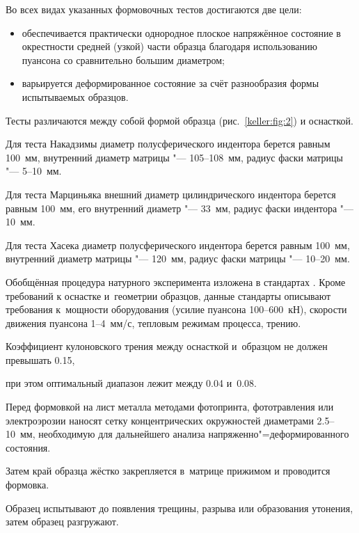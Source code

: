 Во всех видах указанных формовочных тестов достигаются две цели: 

\begin{itemize}

\item[а)] обеспечивается практически однородное плоское напряжённое состояние в окрестности средней (узкой) части образца благодаря использованию  пуансона со сравнительно большим диаметром; 

\item[б)] варьируется деформированное состояние за счёт разнообразия формы испытываемых образцов. 

\end{itemize}



Тесты различаются между собой формой образца (рис.~\ref{keller:fig:2}) и оснасткой. 



Для теста Накадзимы диаметр полусферического индентора берется равным 100~мм, внутренний диаметр матрицы "--- 105--108~мм, радиус фаски матрицы "--- 5--10~мм. 

Для теста Марциньяка внешний диаметр цилиндрического индентора берется равным 100~мм, его внутренний диаметр "--- 33~мм, радиус фаски индентора "--- 10~мм. 

Для теста Хасека диаметр полусферического индентора берется равным 100~мм, внутренний диаметр матрицы "--- 120~мм, радиус фаски матрицы "--- 10--20~мм.  



Обобщённая процедура натурного эксперимента изложена в стандартах \cite{keller:bib:iso ,  keller:bib:astmfld}.  Кроме требований к оснастке и~геометрии образцов, данные стандарты описывают требования к~мощности оборудования (усилие пуансона 100--600~кН), скорости движения пуансона 1--4~мм/с, тепловым режимам процесса, трению. 

Коэффициент кулоновского трения между оснасткой и~образцом не должен превышать 0.15, 

при этом оптимальный диапазон лежит между 0.04 и~0.08. 

Перед формовкой на лист металла методами фотопринта, фототравления или электроэрозии наносят сетку концентрических окружностей диаметрами 2.5--10~мм, необходимую для дальнейшего анализа напряженно"=деформированного состояния. 

Затем край образца жёстко закрепляется в~матрице прижимом и проводится формовка. 

Образец испытывают до появления трещины, разрыва или образования утонения, затем образец разгружают. 

